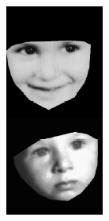 \begin{figure}[t]
\centering
	\begin{subfigure}[t]{0.2\textwidth}
		\includegraphics[width=\textwidth]{gandhi/lanitis1.png}

\end{subfigure}
\end{figure}
